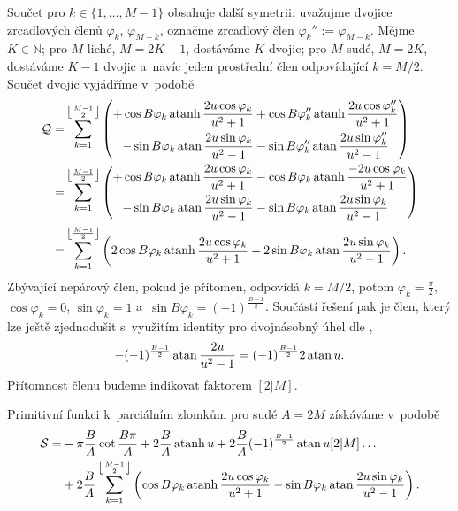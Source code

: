 Součet pro $k\in\{1,\dots,M-1\}$ obsahuje další symetrii: uvažujme dvojice zrcadlových členů $\varphi_k$, $\varphi_{M-k}$, označme zrcadlový člen $\varphi_k'':=\varphi_{M-k}$. Mějme $K\in\mathbb{N}$; pro $M$ liché, $M=2K+1$, dostáváme $K$ dvojic; pro $M$ sudé, $M=2K$, dostáváme $K-1$ dvojic a~navíc jeden prostřední člen odpovídající $k=M/2$. Součet dvojic vyjádříme v~podobě
\begin{align}
    \mathcal{Q}=&\sum_{k=1}^{\left\lfloor\frac{M-1}{2}\right\rfloor}\left(\begin{aligned}
        +\cos{B\varphi_k}\operatorname{atanh}\frac{2u\cos{\varphi_k}}{u^2+1}&+\cos{B\varphi_k''}\operatorname{atanh}\frac{2u\cos{\varphi_k''}}{u^2+1}\\
        -\sin{B\varphi_k}\operatorname{atan}{\frac{2u\sin{\varphi_k}}{u^2-1}}&-\sin{B\varphi_k''}\operatorname{atan}{\frac{2u\sin{\varphi_k''}}{u^2-1}}
    \end{aligned}\right)
    \nonumber\\
    =&\sum_{k=1}^{\left\lfloor\frac{M-1}{2}\right\rfloor}\left(\begin{aligned}
        +\cos{B\varphi_k}\operatorname{atanh}\frac{2u\cos{\varphi_k}}{u^2+1}&-\cos{B\varphi_k}\operatorname{atanh}\frac{-2u\cos{\varphi_k}}{u^2+1}\\
        -\sin{B\varphi_k}\operatorname{atan}{\frac{2u\sin{\varphi_k}}{u^2-1}}&-\sin{B\varphi_k}\operatorname{atan}{\frac{2u\sin{\varphi_k}}{u^2-1}}
    \end{aligned}\right)\nonumber\\
    =&\sum_{k=1}^{\left\lfloor\frac{M-1}{2}\right\rfloor} \left(
        2\cos{B\varphi_k}\operatorname{atanh}\frac{2u\cos{\varphi_k}}{u^2+1}
        -2\sin{B\varphi_k}\operatorname{atan}{\frac{2u\sin{\varphi_k}}{u^2-1}}
    \right).
\end{align}
Zbývající nepárový člen, pokud je přítomen, odpovídá $k=M/2$, potom $\varphi_{k}=\frac{\pi}{2}$, $\cos \varphi_{k}=0$, $\sin \varphi_{k}=1$ a~$\sin{B\varphi_k}=(-1)^{\frac{B-1}{2}}$. Součástí řešení pak je člen, který lze ještě zjednodušit s~využitím identity pro dvojnásobný úhel dle ,
\begin{equation}
    -(-1)^{\frac{B-1}{2}}\operatorname{atan}\frac{2u}{u^2-1}=(-1)^{\frac{B-1}{2}}2\operatorname{atan} u.
\end{equation}
Přítomnost členu budeme indikovat faktorem $[2|M]$.

Primitivní funkci k~parciálním zlomkům pro sudé $A=2M$ získáváme v~podobě
\begin{align}\label{eq:solution_even}
    \mathcal{S}=&-\pi\frac{B}{A}\cot{\frac{B\pi}{A}}+2\frac{B}{A}\operatorname{atanh}{u}+2\frac{B}{A}(-1)^\frac{B-1}{2}\operatorname{atan}{u}[2|M]\dots\nonumber\\
    &+2\frac{B}{A}\sum_{k=1}^{\left\lfloor\frac{M-1}{2}\right\rfloor}
    \left(
        \cos{B\varphi_k}\operatorname{atanh}\frac{2u\cos{\varphi_k}}{u^2+1}
        -\sin{B\varphi_k}\operatorname{atan}{\frac{2u\sin{\varphi_k}}{u^2-1}}
    \right).
\end{align}

